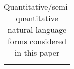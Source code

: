 \begin{table}[!ht]
\begin{tabular}{>{\raggedright\arraybackslash}p{2cm} >{\raggedright\arraybackslash}p{5cm} >{\raggedright\arraybackslash}p{6cm}}
\begin{lstlisting}[language=Fluid,numbers=none]
        \end{lstlisting} \\
        \hline
    \end{tabular}
    \caption{Quantitative/semi-quantitative natural language forms considered in this paper}
    \label{tab:fluid_examples}
\end{table}
